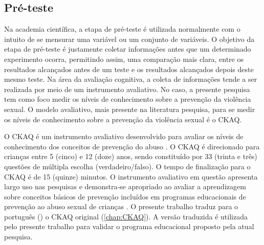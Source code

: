\subsection{Pré-teste}\label{subsec:preteste}

Na academia científica, a etapa de pré-teste é utilizada normalmente com o intuito de se mensurar uma variável ou um conjunto de variáveis. O objetivo da etapa de pré-teste é justamente coletar informações antes que um determinado experimento ocorra, permitindo assim, uma comparação mais clara, entre os resultados alcançados antes de um teste e os resultados alcançados depois deste mesmo teste. Na área da avaliação cognitiva, a coleta de informações tende a ser realizada por meio de um instrumento avaliativo. No caso, a presente pesquisa tem como foco medir os níveis de conhecimento sobre a prevenção da violência sexual. O modelo avaliativo, mais presente na literatura pesquisa, para se medir os níveis de conhecimento sobre a prevenção da violência sexual é o \ac{CKAQ}.

O \ac{CKAQ} é um instrumento avaliativo desenvolvido para avaliar os níveis de conhecimento dos conceitos de prevenção do abuso \cite{tutty1992ability}. O \ac{CKAQ} é direcionado para crianças entre 5 (cinco) e 12 (doze) anos, sendo constituído por 33 (trinta e três) questões de múltipla escolha (verdadeiro/falso). O tempo de finalização para o \ac{CKAQ} é de 15 (quinze) minutos. O instrumento avaliativo em questão apresenta largo uso nas pesquisas e demonstra-se apropriado ao avaliar a aprendizagem sobre conceitos básicos de prevenção incluídos em programas educacionais de prevenção ao abuso sexual de crianças \cite{tutty1992ability}. O presente trabalho traduz para o português () o \ac{CKAQ} original (\autoref{chap:CKAQ}). A versão traduzida é utilizada pelo presente trabalho para validar o programa educacional proposto pela atual pesquisa.%


